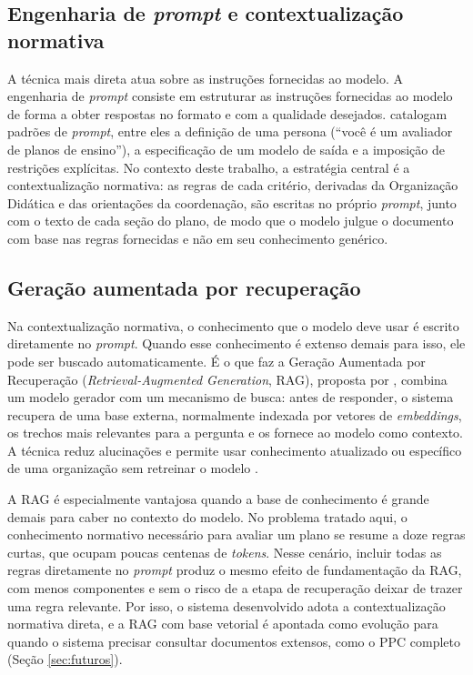 \subsection{Engenharia de \textit{prompt} e contextualização normativa}

A técnica mais direta atua sobre as instruções fornecidas ao modelo. A engenharia de \textit{prompt} consiste em estruturar as instruções fornecidas ao modelo de forma a obter respostas no formato e com a qualidade desejados.  catalogam padrões de \textit{prompt}, entre eles a definição de uma persona (``você é um avaliador de planos de ensino''), a especificação de um modelo de saída e a imposição de restrições explícitas. No contexto deste trabalho, a estratégia central é a contextualização normativa: as regras de cada critério, derivadas da Organização Didática e das orientações da coordenação, são escritas no próprio \textit{prompt}, junto com o texto de cada seção do plano, de modo que o modelo julgue o documento com base nas regras fornecidas e não em seu conhecimento genérico.

\subsection{Geração aumentada por recuperação}

Na contextualização normativa, o conhecimento que o modelo deve usar é escrito diretamente no \textit{prompt}. Quando esse conhecimento é extenso demais para isso, ele pode ser buscado automaticamente. É o que faz a Geração Aumentada por Recuperação (\textit{Retrieval-Augmented Generation}, RAG), proposta por , combina um modelo gerador com um mecanismo de busca: antes de responder, o sistema recupera de uma base externa, normalmente indexada por vetores de \textit{embeddings}, os trechos mais relevantes para a pergunta e os fornece ao modelo como contexto. A técnica reduz alucinações e permite usar conhecimento atualizado ou específico de uma organização sem retreinar o modelo \cite{lewis2020, Gao2023}.

A RAG é especialmente vantajosa quando a base de conhecimento é grande demais para caber no contexto do modelo. No problema tratado aqui, o conhecimento normativo necessário para avaliar um plano se resume a doze regras curtas, que ocupam poucas centenas de \textit{tokens}. Nesse cenário, incluir todas as regras diretamente no \textit{prompt} produz o mesmo efeito de fundamentação da RAG, com menos componentes e sem o risco de a etapa de recuperação deixar de trazer uma regra relevante. Por isso, o sistema desenvolvido adota a contextualização normativa direta, e a RAG com base vetorial é apontada como evolução para quando o sistema precisar consultar documentos extensos, como o PPC completo (Seção \ref{sec:futuros}).

